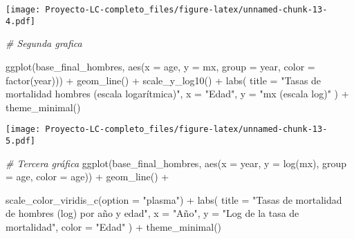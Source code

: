 \documentclass[
]{article}
\newenvironment{Shaded}{\begin{snugshade}}{\end{snugshade}}
\newcommand{\AttributeTok}[1]{\textcolor[rgb]{0.77,0.63,0.00}{#1}}
\newcommand{\CommentTok}[1]{\textcolor[rgb]{0.56,0.35,0.01}{\textit{#1}}}
\newcommand{\FunctionTok}[1]{\textcolor[rgb]{0.00,0.00,0.00}{#1}}
\newcommand{\NormalTok}[1]{#1}
\newcommand{\SpecialCharTok}[1]{\textcolor[rgb]{0.00,0.00,0.00}{#1}}
\newcommand{\StringTok}[1]{\textcolor[rgb]{0.31,0.60,0.02}{#1}}
\begin{document}
\texttt{[image: Proyecto-LC-completo\_files/figure-latex/unnamed-chunk-13-4.pdf]}

\begin{Shaded}
\begin{Highlighting}[]
\CommentTok{\# Segunda grafica}

\FunctionTok{ggplot}\NormalTok{(base\_final\_hombres, }\FunctionTok{aes}\NormalTok{(}\AttributeTok{x =}\NormalTok{ age, }\AttributeTok{y =}\NormalTok{ mx, }\AttributeTok{group =}\NormalTok{ year, }\AttributeTok{color =} \FunctionTok{factor}\NormalTok{(year))) }\SpecialCharTok{+}
  \FunctionTok{geom\_line}\NormalTok{() }\SpecialCharTok{+}
  \FunctionTok{scale\_y\_log10}\NormalTok{() }\SpecialCharTok{+}
  \FunctionTok{labs}\NormalTok{(}
    \AttributeTok{title =} \StringTok{"Tasas de mortalidad hombres (escala logarítmica)"}\NormalTok{,}
    \AttributeTok{x =} \StringTok{"Edad"}\NormalTok{,}
    \AttributeTok{y =} \StringTok{"mx (escala log)"}
\NormalTok{  ) }\SpecialCharTok{+}
  \FunctionTok{theme\_minimal}\NormalTok{()}
\end{Highlighting}
\end{Shaded}

\texttt{[image: Proyecto-LC-completo\_files/figure-latex/unnamed-chunk-13-5.pdf]}

\begin{Shaded}
\begin{Highlighting}[]
\CommentTok{\# Tercera gráfica}
\FunctionTok{ggplot}\NormalTok{(base\_final\_hombres, }\FunctionTok{aes}\NormalTok{(}\AttributeTok{x =}\NormalTok{ year, }
                               \AttributeTok{y =} \FunctionTok{log}\NormalTok{(mx),       }
                               \AttributeTok{group =}\NormalTok{ age, }
                               \AttributeTok{color =}\NormalTok{ age)) }\SpecialCharTok{+}
  \FunctionTok{geom\_line}\NormalTok{() }\SpecialCharTok{+}
 
  \FunctionTok{scale\_color\_viridis\_c}\NormalTok{(}\AttributeTok{option =} \StringTok{"plasma"}\NormalTok{) }\SpecialCharTok{+}  
  \FunctionTok{labs}\NormalTok{(}
    \AttributeTok{title =} \StringTok{"Tasas de mortalidad de hombres (log) por año y edad"}\NormalTok{,}
    \AttributeTok{x =} \StringTok{"Año"}\NormalTok{,}
    \AttributeTok{y =} \StringTok{"Log de la tasa de mortalidad"}\NormalTok{,}
    \AttributeTok{color =} \StringTok{"Edad"}
\NormalTok{  ) }\SpecialCharTok{+}
  \FunctionTok{theme\_minimal}\NormalTok{()}
\end{Highlighting}
\end{Shaded}
\end{document}
